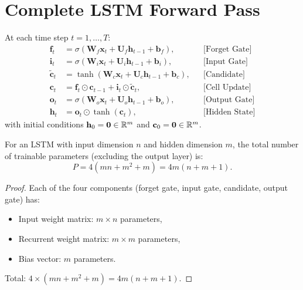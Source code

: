 \documentclass[11pt,a4paper]{article}
\begin{document}
\section{Complete LSTM Forward Pass}
\label{sec:forward-pass}

\begin{keyresult}[title={LSTM Forward Equations}]
At each time step $t = 1, \ldots, T$:
\begin{align}
  \mathbf{f}_t &= \sigma(\mathbf{W}_f \mathbf{x}_t +
    \mathbf{U}_f \mathbf{h}_{t-1} + \mathbf{b}_f),
    && \text{[Forget Gate]} \label{eq:lstm-f} \\
  \mathbf{i}_t &= \sigma(\mathbf{W}_i \mathbf{x}_t +
    \mathbf{U}_i \mathbf{h}_{t-1} + \mathbf{b}_i),
    && \text{[Input Gate]} \label{eq:lstm-i} \\
  \tilde{\mathbf{c}}_t &= \tanh(\mathbf{W}_c \mathbf{x}_t +
    \mathbf{U}_c \mathbf{h}_{t-1} + \mathbf{b}_c),
    && \text{[Candidate]} \label{eq:lstm-c-tilde} \\
  \mathbf{c}_t &= \mathbf{f}_t \odot \mathbf{c}_{t-1} +
    \mathbf{i}_t \odot \tilde{\mathbf{c}}_t,
    && \text{[Cell Update]} \label{eq:lstm-c} \\
  \mathbf{o}_t &= \sigma(\mathbf{W}_o \mathbf{x}_t +
    \mathbf{U}_o \mathbf{h}_{t-1} + \mathbf{b}_o),
    && \text{[Output Gate]} \label{eq:lstm-o} \\
  \mathbf{h}_t &= \mathbf{o}_t \odot \tanh(\mathbf{c}_t),
    && \text{[Hidden State]} \label{eq:lstm-h}
\end{align}
with initial conditions $\mathbf{h}_0 = \mathbf{0} \in \mathbb{R}^m$ and
$\mathbf{c}_0 = \mathbf{0} \in \mathbb{R}^m$.
\end{keyresult}

\begin{proposition}
\label{prop:lstm-params}
For an LSTM with input dimension $n$ and hidden dimension $m$, the
total number of trainable parameters (excluding the output layer) is:
\begin{equation}
  P = 4(mn + m^2 + m) = 4m(n + m + 1).
  \label{eq:lstm-params}
\end{equation}
\end{proposition}

\begin{proof}
Each of the four components (forget gate, input gate, candidate,
output gate) has:
\begin{itemize}[nosep]
  \item Input weight matrix: $m \times n$ parameters,
  \item Recurrent weight matrix: $m \times m$ parameters,
  \item Bias vector: $m$ parameters.
\end{itemize}
Total: $4 \times (mn + m^2 + m) = 4m(n + m + 1)$.
\end{proof}
\end{document}
